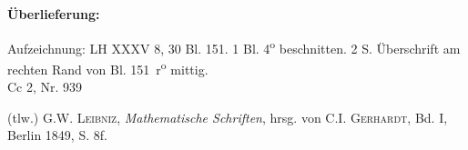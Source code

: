 \begin{ledgroupsized}[r]{120mm}
\footnotesize 
\pstart 
\noindent\textbf{\"{U}berlieferung:}
\pend
\end{ledgroupsized}
\begin{ledgroupsized}[r]{114mm}
\footnotesize 
\pstart \parindent -6mm
%
Aufzeichnung: LH XXXV 8, 30 Bl. 151. 1 Bl. 4\textsuperscript{o} beschnitten.
2 S. Überschrift am rechten Rand von Bl. 151~r\textsuperscript{o} mittig.\\%
Cc 2, Nr. 939
\pend
\end{ledgroupsized}
%
\begin{ledgroupsized}[r]{114mm}
\footnotesize 
\pstart \parindent -6mm
%
(tlw.) \textsc{G.W. Leibniz}, \textit{Mathematische Schriften}, hrsg. von \textsc{C.I. Gerhardt}, Bd. I, Berlin 1849, S. 8f.\cite{01043}
\pend
\end{ledgroupsized}
%
\vspace*{8mm}
\count{}
\count{}
\count{}
